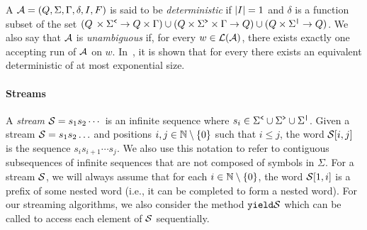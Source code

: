 A \vpa $\mathcal{A} = (Q, \Sigma, \Gamma, \delta, I, F)$ is said to be \emph{deterministic} if $|I| =1$ and $\delta$ is a function subset of the set $(Q\,\times\Sigma^{\texttt{<}} \to Q\times \Gamma) \cup
(Q\times\Sigma^{\texttt{>}}\times\Gamma \to Q)\cup
(Q\times\Sigma^{\texttt{|}} \to Q)$. We also say that $\mathcal{A}$ is \emph{unambiguous} if, for every $w \in \mathcal{L}(\mathcal{A})$, there exists exactly one accepting run of $\mathcal{A}$ on $w$. In~\cite{AlurM04}, it is shown that for every \vpa there exists an equivalent deterministic \vpa of at most exponential size. 

\paragraph{Streams} A {\em stream} $\mathcal{S} = s_1 s_2 \cdots$ is an infinite sequence where $s_i\in \Sigma^{\texttt{<}} \cup \Sigma^{\texttt{>}} \cup \Sigma^{\texttt{|}}$. Given a stream $\mathcal{S} = s_1 s_2 \ldots$ and positions $i,j\in\mathbb{N} \setminus \{0\}$ such that $i \leq j$, the word $\mathcal{S}[i,j]$ is the sequence $s_i s_{i+1} \cdots s_j$. We also use this notation to refer to contiguous subsequences of infinite sequences that are not composed of symbols in $\Sigma$. For a stream $\mathcal{S}$, we will always assume that for each $i \in \mathbb{N} \setminus \{0\}$, the word $\mathcal{S}[1,i]$ is a prefix of some nested word (i.e., it can be completed to form a nested word). For our streaming algorithms, we also consider the method $\texttt{yield}{\mathcal{S}}$ which can be called to access each element of $\mathcal{S}$ sequentially.